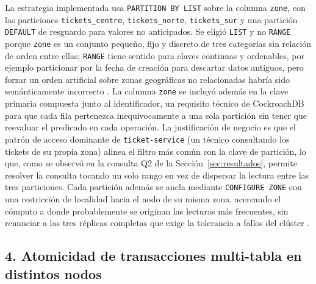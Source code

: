 \documentclass[11pt,a4paper]{article}
\begin{document}
La estrategia implementada usa \texttt{PARTITION BY LIST} sobre la columna
\texttt{zone}, con las particiones \texttt{tickets\_centro},
\texttt{tickets\_norte}, \texttt{tickets\_sur} y una partición
\texttt{DEFAULT} de resguardo para valores no anticipados. Se eligió
\texttt{LIST} y no \texttt{RANGE} porque \texttt{zone} es un conjunto
pequeño, fijo y discreto de tres categorías sin relación de orden entre
ellas; \texttt{RANGE} tiene sentido para claves continuas y ordenables, por
ejemplo particionar por la fecha de creación para descartar datos antiguos,
pero forzar un orden artificial sobre zonas geográficas no relacionadas
habría sido semánticamente incorrecto \cite{ge2024,mehta2022}. La columna
\texttt{zone} se incluyó además en la clave primaria compuesta junto al
identificador, un requisito técnico de CockroachDB para que cada fila
pertenezca inequívocamente a una sola partición sin tener que reevaluar el
predicado en cada operación. La justificación de negocio es que el patrón
de acceso dominante de \texttt{ticket-service} (un técnico consultando
los tickets de su propia zona) alinea el filtro más común con la clave de
partición, lo que, como se observó en la consulta Q2 de la
Sección~\ref{sec:resultados}, permite resolver la consulta tocando un solo
rango en vez de dispersar la lectura entre las tres particiones. Cada
partición además se ancla mediante \texttt{CONFIGURE ZONE} con una
restricción de localidad hacia el nodo de su misma zona, acercando el
cómputo a donde probablemente se originan las lecturas más frecuentes, sin
renunciar a las tres réplicas completas que exige la tolerancia a fallos del
clúster \cite{taft2020}.

\subsection*{4. Atomicidad de transacciones multi-tabla en distintos nodos}
\end{document}
